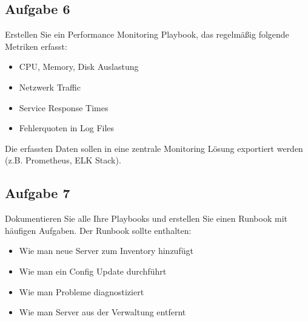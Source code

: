 \documentclass{article}
\begin{document}
    \subsection{Aufgabe 6}
    Erstellen Sie ein Performance Monitoring Playbook, das regelmäßig folgende Metriken erfasst:
    \begin{itemize}
        \item CPU, Memory, Disk Auslastung
        \item Netzwerk Traffic
        \item Service Response Times
        \item Fehlerquoten in Log Files
    \end{itemize}
    
    Die erfassten Daten sollen in eine zentrale Monitoring Lösung exportiert werden (z.B. Prometheus, ELK Stack).

    \subsection{Aufgabe 7}
    Dokumentieren Sie alle Ihre Playbooks und erstellen Sie einen Runbook mit häufigen Aufgaben.
    Der Runbook sollte enthalten:
    \begin{itemize}
        \item Wie man neue Server zum Inventory hinzufügt
        \item Wie man ein Config Update durchführt
        \item Wie man Probleme diagnostiziert
        \item Wie man Server aus der Verwaltung entfernt
    \end{itemize}
\end{document}

